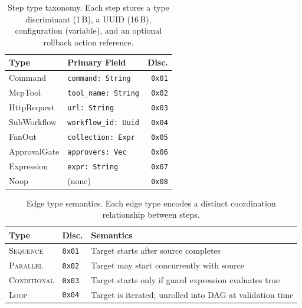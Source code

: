 \documentclass[10pt, twocolumn]{article}
\begin{document}
\begin{table}[t]
\caption{Step type taxonomy. Each step stores a type discriminant (1\,B), a UUID (16\,B), configuration (variable), and an optional rollback action reference.}
\label{tab:steptypes}
\centering\scriptsize
\begin{tabular}{@{}llr@{}}
\toprule
\textbf{Type} & \textbf{Primary Field} & \textbf{Disc.} \\
\midrule
Command      & \texttt{command: String}    & \texttt{0x01} \\
McpTool      & \texttt{tool\_name: String}  & \texttt{0x02} \\
HttpRequest  & \texttt{url: String}        & \texttt{0x03} \\
SubWorkflow  & \texttt{workflow\_id: Uuid}  & \texttt{0x04} \\
FanOut       & \texttt{collection: Expr}   & \texttt{0x05} \\
ApprovalGate & \texttt{approvers: Vec}     & \texttt{0x06} \\
Expression   & \texttt{expr: String}       & \texttt{0x07} \\
Noop         & (none)                      & \texttt{0x08} \\
\bottomrule
\end{tabular}
\end{table}

\begin{table}[t]
\caption{Edge type semantics. Each edge type encodes a distinct coordination relationship between steps.}
\label{tab:edgetypes}
\centering\scriptsize
\begin{tabular}{@{}llp{3.2cm}@{}}
\toprule
\textbf{Type} & \textbf{Disc.} & \textbf{Semantics} \\
\midrule
\textsc{Sequence}    & \texttt{0x01} & Target starts after source completes \\
\textsc{Parallel}    & \texttt{0x02} & Target may start concurrently with source \\
\textsc{Conditional} & \texttt{0x03} & Target starts only if guard expression evaluates true \\
\textsc{Loop}        & \texttt{0x04} & Target is iterated; unrolled into DAG at validation time \\
\bottomrule
\end{tabular}
\end{table}

\end{document}
